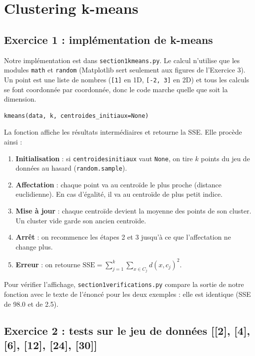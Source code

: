 \documentclass[11pt,a4paper]{article}
\renewcommand{\_}{\underscoreorig\allowbreak}
\begin{document}
\section{Clustering k-means}

\subsection{Exercice 1 : implémentation de k-means}

Notre implémentation est dans \texttt{section1\_kmeans.py}. Le calcul n'utilise que les modules \texttt{math} et \texttt{random} (Matplotlib sert seulement aux figures de l'Exercice 3). Un point est une liste de nombres (\texttt{[1]} en 1D, \texttt{[-2, 3]} en 2D) et tous les calculs se font coordonnée par coordonnée, donc le code marche quelle que soit la dimension.
\begin{lstlisting}
kmeans(data, k, centroides_initiaux=None)
\end{lstlisting}
La fonction affiche les résultats intermédiaires et retourne la SSE. Elle procède ainsi :
\begin{enumerate}
  \item \textbf{Initialisation} : si \texttt{centroides\_initiaux} vaut \texttt{None}, on tire $k$ points du jeu de données au hasard (\texttt{random.sample}).
  \item \textbf{Affectation} : chaque point va au centroïde le plus proche (distance euclidienne). En cas d'égalité, il va au centroïde de plus petit indice.
  \item \textbf{Mise à jour} : chaque centroïde devient la moyenne des points de son cluster. Un cluster vide garde son ancien centroïde.
  \item \textbf{Arrêt} : on recommence les étapes 2 et 3 jusqu'à ce que l'affectation ne change plus.
  \item \textbf{Erreur} : on retourne $\mathrm{SSE} = \sum_{j=1}^{k} \sum_{x \in C_j} d(x, c_j)^2$.
\end{enumerate}

Pour vérifier l'affichage, \texttt{section1\_verifications.py} compare la sortie de notre fonction avec le texte de l'énoncé pour les deux exemples : elle est identique (SSE de 98.0 et de 2.5).

\subsection{Exercice 2 : tests sur le jeu de données [[2], [4], [6], [12], [24], [30]]}
\end{document}
